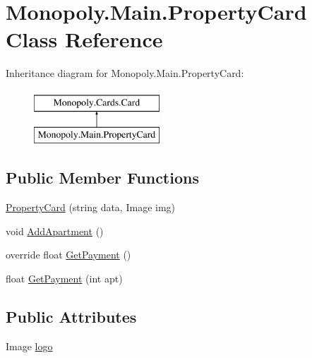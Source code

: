\hypertarget{class_monopoly_1_1_main_1_1_property_card}{}\section{Monopoly.\+Main.\+Property\+Card Class Reference}
\label{class_monopoly_1_1_main_1_1_property_card}
Inheritance diagram for Monopoly.\+Main.\+Property\+Card\+:\begin{figure}[H]
\begin{center}
\leavevmode
\includegraphics[height=2.000000cm]{class_monopoly_1_1_main_1_1_property_card}
\end{center}
\end{figure}
\subsection*{Public Member Functions}
\begin{DoxyCompactItemize}
\item 
\mbox{\hyperlink{class_monopoly_1_1_main_1_1_property_card_a987490ea399f0eccc5a60653f1fe4a37}{Property\+Card}} (string data, Image img)
\item 
void \mbox{\hyperlink{class_monopoly_1_1_main_1_1_property_card_aaf967fdfb24b005ee47a44ac190fef82}{Add\+Apartment}} ()
\item 
override float \mbox{\hyperlink{class_monopoly_1_1_main_1_1_property_card_a372062ee95b60c03637cdd08667d74ba}{Get\+Payment}} ()
\item 
float \mbox{\hyperlink{class_monopoly_1_1_main_1_1_property_card_aaf5c68d69fe535ec61c0dd71a23fc5c7}{Get\+Payment}} (int apt)
\end{DoxyCompactItemize}
\subsection*{Public Attributes}
\begin{DoxyCompactItemize}
\item 
Image \mbox{\hyperlink{class_monopoly_1_1_cards_1_1_card_a84da6fc446a55518f9bdf8fa7eef9057}{logo}}
\end{DoxyCompactItemize}
